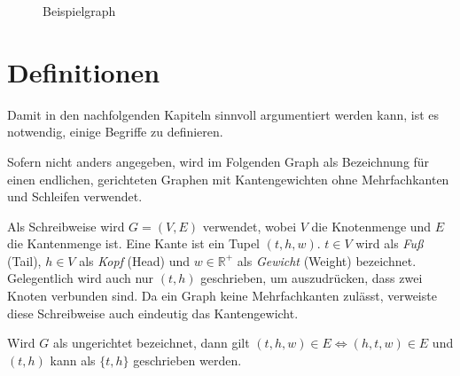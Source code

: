 \begin{figure}[ht]
    \caption{Beispielgraph}
    \label{graphs:fig:beispielgraph}
\end{figure}

\section{Definitionen}
Damit in den nachfolgenden Kapiteln sinnvoll argumentiert werden kann, ist es notwendig, einige Begriffe zu definieren.

\begin{definition}[Graph]
    Sofern nicht anders angegeben, wird im Folgenden Graph als Bezeichnung für einen endlichen, gerichteten Graphen mit Kantengewichten ohne Mehrfachkanten und Schleifen verwendet.

    Als Schreibweise wird $G = (V, E)$ verwendet, wobei $V$ die Knotenmenge und $E$ die Kantenmenge ist. Eine Kante ist ein Tupel $(t, h, w)$. $t \in V$ wird als \emph{Fuß} (Tail), $h \in V$ als \emph{Kopf} (Head) und $w \in \mathbb{R}^+$ als \emph{Gewicht} (Weight) bezeichnet. Gelegentlich wird auch nur $(t, h)$ geschrieben, um auszudrücken, dass zwei Knoten verbunden sind. Da ein Graph keine Mehrfachkanten zulässt, verweiste diese Schreibweise auch eindeutig das Kantengewicht.

    Wird $G$ als ungerichtet bezeichnet, dann gilt $(t, h, w) \in E \Leftrightarrow (h, t, w) \in E$ und $(t, h)$ kann als $\{ t, h \}$ geschrieben werden.
\end{definition}

